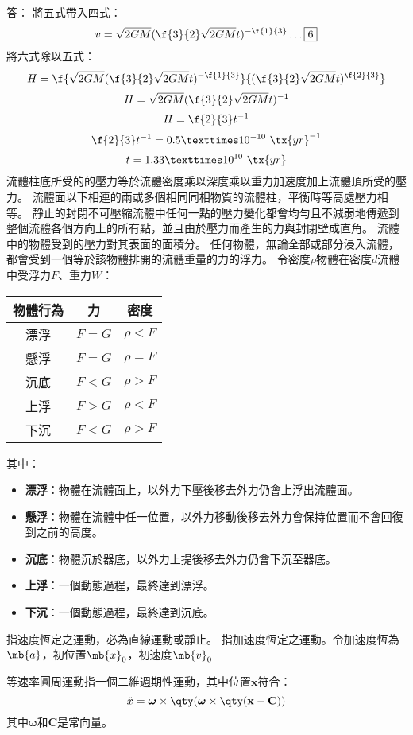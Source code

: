\documentclass[a4paper,12pt]{article}
\begin{document}
答： 將五式帶入四式：
\[v=\sqrt{2GM}(\f{3}{2}\sqrt{2GM}t)^{-\f{1}{3}}\ldots\boxed{6}\]
將六式除以五式：
\[H=\f{\sqrt{2GM}(\f{3}{2}\sqrt{2GM}t)^{-\f{1}{3}}}{(\f{3}{2}\sqrt{2GM}t)^{\f{2}{3}}}\]
\[H=\sqrt{2GM}(\f{3}{2}\sqrt{2GM}t)^{-1}\]
\[H=\f{2}{3}t^{-1}\]
\[\f{2}{3}t^{-1}=0.5×10^{-10}\ \tx{yr}^{-1}\]
\[t=1.33×10^{10}\ \tx{yr}\]
流體柱底所受的的壓力等於流體密度乘以深度乘以重力加速度加上流體頂所受的壓力。
流體面以下相連的兩或多個相同同相物質的流體柱，平衡時等高處壓力相等。
靜止的封閉不可壓縮流體中任何一點的壓力變化都會均勻且不減弱地傳遞到整個流體各個方向上的所有點，並且由於壓力而產生的力與封閉壁成直角。
流體中的物體受到的壓力對其表面的面積分。
任何物體，無論全部或部分浸入流體，都會受到一個等於該物體排開的流體重量的力的浮力。
令密度$\rho$物體在密度$d$流體中受浮力$F$、重力$W$：
\begin{longtable}[c]{|c|c|c|}
\hline
物體行為 & 力 & 密度 \\\hline\endhead
漂浮 & $F=G$ & $\rho<F$ \\\hline
懸浮 & $F=G$ & $\rho=F$ \\\hline
沉底 & $F<G$ & $\rho>F$ \\\hline
上浮 & $F>G$ & $\rho<F$ \\\hline
下沉 & $F<G$ & $\rho>F$ \\\hline
\end{longtable}\FB
其中：
\begin{itemize}
\item\textbf{漂浮}：物體在流體面上，以外力下壓後移去外力仍會上浮出流體面。
\item\textbf{懸浮}：物體在流體中任一位置，以外力移動後移去外力會保持位置而不會回復到之前的高度。
\item\textbf{沉底}：物體沉於器底，以外力上提後移去外力仍會下沉至器底。
\item\textbf{上浮}：一個動態過程，最終達到漂浮。
\item\textbf{下沉}：一個動態過程，最終達到沉底。
\end{itemize}
指速度恆定之運動，必為直線運動或靜止。
指加速度恆定之運動。令加速度恆為$\mb{a}$，初位置$\mb{x}_0$，初速度$\mb{v}_0$

等速率圓周運動指一個二維週期性運動，其中位置$\mathbf{x}$符合：
\[\ddot{x}=\boldsymbol{\omega}\times\qty(\boldsymbol{\omega}\times\qty(\mathbf{x}-\mathbf{C}))\]
其中$\boldsymbol{\omega}$和$\mathbf{C}$是常向量。
\end{document}
